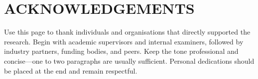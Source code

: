 \section*{ACKNOWLEDGEMENTS}

Use this page to thank individuals and organisations that directly supported
the research. Begin with academic supervisors and internal examiners, followed
by industry partners, funding bodies, and peers. Keep the tone professional and
concise—one to two paragraphs are usually sufficient. Personal dedications
should be placed at the end and remain respectful.

\clearpage
